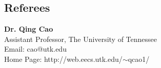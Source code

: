 \documentclass[margin, centered]{resume}
\begin{document}
\begin{resume}

\section{\mysidestyle Referees} 

\textbf{Dr. Qing Cao}\\
Assistant Professor, The University of Tennessee\\
Email: cao@utk.edu\\
Home Page: http://web.eecs.utk.edu/$\sim$qcao1/

\end{resume}
\end{document}
